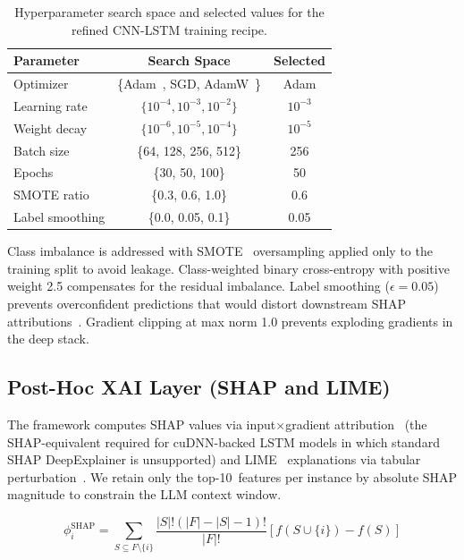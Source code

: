 \documentclass[sensors,apajournal,article,submit,moreauthors]{Definitions/mdpi}
\begin{document}
\begin{table}[H]
\caption{Hyperparameter search space and selected values for the refined CNN-LSTM training recipe.}
\label{tab:hyperparameter_search}
\begin{tabular}{lcc}
\toprule
\textbf{Parameter} & \textbf{Search Space} & \textbf{Selected} \\
\midrule
Optimizer & \{Adam~\citep{chollet2017xception}, SGD, AdamW~\citep{loshchilov2017adamw}\} & Adam \\
Learning rate & $\{10^{-4}, 10^{-3}, 10^{-2}\}$ & $10^{-3}$ \\
Weight decay & $\{10^{-6}, 10^{-5}, 10^{-4}\}$ & $10^{-5}$ \\
Batch size & \{64, 128, 256, 512\} & 256 \\
Epochs & \{30, 50, 100\} & 50 \\
SMOTE ratio & \{0.3, 0.6, 1.0\} & 0.6 \\
Label smoothing & \{0.0, 0.05, 0.1\} & 0.05 \\
\bottomrule
\end{tabular}
\end{table}

Class imbalance is addressed with SMOTE~\citep{chawla2002smote} oversampling applied only to the training split to avoid leakage. Class-weighted binary cross-entropy with positive weight 2.5 compensates for the residual imbalance. Label smoothing ($\epsilon = 0.05$) prevents overconfident predictions that would distort downstream SHAP attributions~\citep{springenberg2014striving,sundararajan2017axiomatic}. Gradient clipping at max norm 1.0 prevents exploding gradients in the deep stack.

\subsection{Post-Hoc XAI Layer (SHAP and LIME)}

The framework computes SHAP values via input$\times$gradient attribution~\citep{shrikumar2017learning,springenberg2014striving,ancona2018explaining} (the SHAP-equivalent required for cuDNN-backed LSTM models in which standard SHAP DeepExplainer is unsupported) and LIME~\citep{ribeiro2016why,doshi2017towards} explanations via tabular perturbation~\citep{lundberg2017unified}. We retain only the \mbox{top-10 features} per instance by absolute SHAP magnitude to constrain the LLM context window.

\begin{equation}
\phi_i^{\mathrm{SHAP}} = \sum_{S \subseteq F \setminus \{i\}} \frac{|S|!(|F|-|S|-1)!}{|F|!} \left[ f(S \cup \{i\}) - f(S) \right]
\end{equation}
\end{document}
